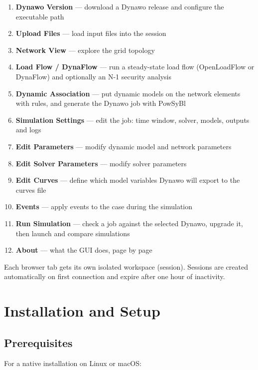 \documentclass[a4paper,11pt]{article}
\begin{document}
\begin{enumerate}[leftmargin=2em]
  \item \textbf{Dynawo Version} --- download a Dynawo release and configure the
    executable path
  \item \textbf{Upload Files} --- load input files into the session
  \item \textbf{Network View} --- explore the grid topology
  \item \textbf{Load Flow / DynaFlow} --- run a steady-state load flow
    (OpenLoadFlow or DynaFlow) and optionally an N-1 security analysis
  \item \textbf{Dynamic Association} --- put dynamic models on the network
    elements with rules, and generate the Dynawo job with PowSyBl
  \item \textbf{Simulation Settings} --- edit the job: time window, solver,
    models, outputs and logs
  \item \textbf{Edit Parameters} --- modify dynamic model and network parameters
  \item \textbf{Edit Solver Parameters} --- modify solver parameters
  \item \textbf{Edit Curves} --- define which model variables Dynawo will export
    to the curves file
  \item \textbf{Events} --- apply events to the case during the simulation
  \item \textbf{Run Simulation} --- check a job against the selected Dynawo,
    upgrade it, then launch and compare simulations
  \item \textbf{About} --- what the GUI does, page by page
\end{enumerate}

Each browser tab gets its own isolated workspace (session). Sessions are
created automatically on first connection and expire after one hour of
inactivity.

\section{Installation and Setup}

\subsection{Prerequisites}

For a native installation on Linux or macOS:
\end{document}
